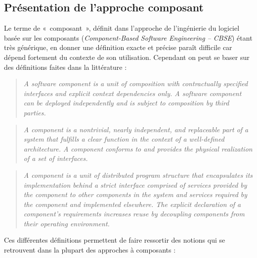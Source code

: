 \subsection{Présentation de l'approche composant}
    
Le terme de «~composant~», définit dans l'approche de l'ingénierie du logiciel basée sur les composants (\emph{Component-Based Software Engineering -- CBSE}) étant très générique, en donner une définition exacte et précise paraît difficile car dépend fortement du contexte de son utilisation. Cependant on peut se baser sur des définitions faites dans la littérature :

\begin{quote}
  \emph{ A software component is a unit of composition with contractually specified interfaces and explicit context dependencies only. A software component can be deployed independently and is subject to composition by third parties.} \cite{Szyperski:2002:CSB:515228}
\end{quote}
  
\begin{quote}
  \emph{ A component is a nontrivial, nearly independent, and replaceable part of a system that fulfills a clear function in the context of a well-defined architecture. A component conforms to and provides the physical realization of a set of interfaces.} \cite{kruchten1998modeling}
\end{quote}
  
\begin{quote}
  \emph{ A component is a unit of distributed program structure that encapsulates its implementation behind a strict interface comprised of services provided by the component to other components in the system and services required by the component and implemented elsewhere. The explicit declaration of a component's requirements increases reuse by decoupling components from their operating environment.} \cite{pryce1998component}
\end{quote}
  
Ces différentes définitions permettent de faire ressortir des notions qui se retrouvent dans la plupart des approches à composants : 
    
